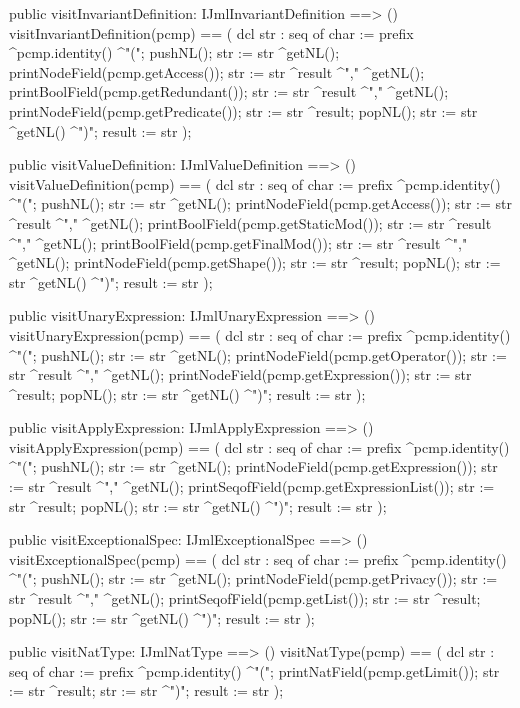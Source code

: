 \begin{vdm_al}
  public visitInvariantDefinition: IJmlInvariantDefinition ==> ()
  visitInvariantDefinition(pcmp) ==
    ( dcl str : seq of char := prefix ^pcmp.identity() ^"(";
      pushNL();
      str := str ^getNL();
      printNodeField(pcmp.getAccess());
      str := str ^result ^"," ^getNL();
      printBoolField(pcmp.getRedundant());
      str := str ^result ^"," ^getNL();
      printNodeField(pcmp.getPredicate());
      str := str ^result;
      popNL();
      str := str ^getNL() ^")";
      result := str );

  public visitValueDefinition: IJmlValueDefinition ==> ()
  visitValueDefinition(pcmp) ==
    ( dcl str : seq of char := prefix ^pcmp.identity() ^"(";
      pushNL();
      str := str ^getNL();
      printNodeField(pcmp.getAccess());
      str := str ^result ^"," ^getNL();
      printBoolField(pcmp.getStaticMod());
      str := str ^result ^"," ^getNL();
      printBoolField(pcmp.getFinalMod());
      str := str ^result ^"," ^getNL();
      printNodeField(pcmp.getShape());
      str := str ^result;
      popNL();
      str := str ^getNL() ^")";
      result := str );

  public visitUnaryExpression: IJmlUnaryExpression ==> ()
  visitUnaryExpression(pcmp) ==
    ( dcl str : seq of char := prefix ^pcmp.identity() ^"(";
      pushNL();
      str := str ^getNL();
      printNodeField(pcmp.getOperator());
      str := str ^result ^"," ^getNL();
      printNodeField(pcmp.getExpression());
      str := str ^result;
      popNL();
      str := str ^getNL() ^")";
      result := str );

  public visitApplyExpression: IJmlApplyExpression ==> ()
  visitApplyExpression(pcmp) ==
    ( dcl str : seq of char := prefix ^pcmp.identity() ^"(";
      pushNL();
      str := str ^getNL();
      printNodeField(pcmp.getExpression());
      str := str ^result ^"," ^getNL();
      printSeqofField(pcmp.getExpressionList());
      str := str ^result;
      popNL();
      str := str ^getNL() ^")";
      result := str );

  public visitExceptionalSpec: IJmlExceptionalSpec ==> ()
  visitExceptionalSpec(pcmp) ==
    ( dcl str : seq of char := prefix ^pcmp.identity() ^"(";
      pushNL();
      str := str ^getNL();
      printNodeField(pcmp.getPrivacy());
      str := str ^result ^"," ^getNL();
      printSeqofField(pcmp.getList());
      str := str ^result;
      popNL();
      str := str ^getNL() ^")";
      result := str );

  public visitNatType: IJmlNatType ==> ()
  visitNatType(pcmp) ==
    ( dcl str : seq of char := prefix ^pcmp.identity() ^"(";
      printNatField(pcmp.getLimit());
      str := str ^result;
      str := str ^")";
      result := str );


\end{vdm_al}
